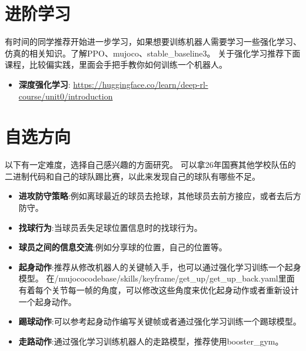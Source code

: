 \documentclass[11pt, UTF8, a4paper]{ctexart} %
\begin{document}
\section{进阶学习}
有时间的同学推荐开始进一步学习，如果想要训练机器人需要学习一些强化学习、仿真的相关知识。了解PPO、mujoco、stable\_baseline3。
\smallbreak
关于强化学习推荐下面课程，比较偏实践，里面会手把手教你如何训练一个机器人。
\begin{itemize}
    \item \textbf{深度强化学习}: \url{https://huggingface.co/learn/deep-rl-course/unit0/introduction}
\end{itemize}
\section{自选方向}
以下有一定难度，选择自己感兴趣的方面研究。
\smallbreak
可以拿26年国赛其他学校队伍的二进制代码和自己的球队踢比赛，以此来发现自己的球队有哪些不足。
\begin{itemize}
    \item \textbf{进攻防守策略}:例如离球最近的球员去抢球，其他球员去前方接应，或者去后方防守。
    \item \textbf{找球行为}:当球员丢失足球位置信息时的找球行为。
    \item \textbf{球员之间的信息交流}:例如分享球的位置，自己的位置等。
    \item \textbf{起身动作}:推荐从修改机器人的关键帧入手，也可以通过强化学习训练一个起身模型。
        \smallbreak 
        在/mujococodebase/skills/keyframe/get\_up/get\_up\_back.yaml里面有着每个关节每一帧的角度，可以修改这些角度来优化起身动作或者重新设计一个起身动作。
    \item \textbf{踢球动作}:可以参考起身动作编写关键帧或者通过强化学习训练一个踢球模型。
    \item \textbf{走路动作}:通过强化学习训练机器人的走路模型，推荐使用booster\_gym。
\end{itemize}
\end{document}
